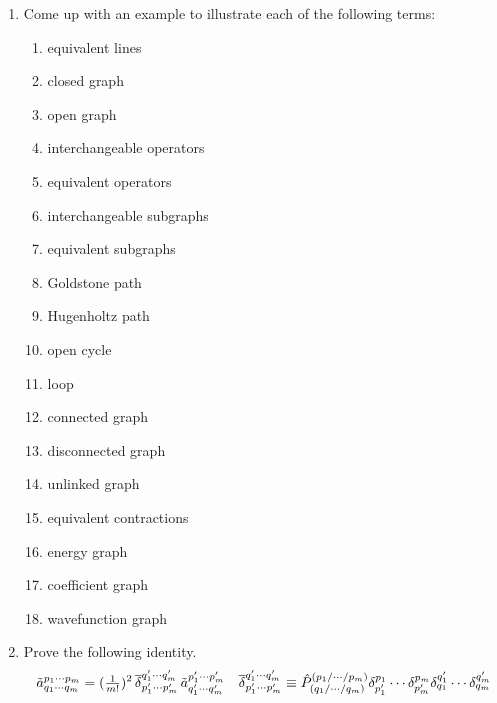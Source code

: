 \documentclass[11pt]{article}
\numberwithin{equation}{section}
\begin{document}
\begin{enumerate}
\item
  Come up with an example to illustrate each of the following terms:
  \begin{multicols}{3}
  \begin{enumerate}
  \item
    equivalent lines
  \item
    closed graph
  \item
    open graph
  \item
    interchangeable operators
  \item
    equivalent operators
  \item
    interchangeable subgraphs
  \item
    equivalent subgraphs
  \item
    Goldstone path
  \item
    Hugenholtz path
  \item
    open cycle
  \item
    loop
  \item
    connected graph
  \item
    disconnected graph
  \item
    unlinked graph
  \item
    equivalent contractions
  \item
    energy graph
  \item
    coefficient graph
  \item
    wavefunction graph
  \end{enumerate}
  \end{multicols}
\item
  Prove the following identity.
\begin{align*}
  \tilde{a}^{p_1\cdots p_m}_{q_1\cdots q_m}
=
  (\tfrac{1}{m!})^2\,
  \overline{\delta }_{p_1'\cdots p_m'}^{q_1'\cdots q_m'}\,
  \tilde{a}^{p_1'\cdots p_m'}_{q_1'\cdots q_m'}
&&
  \overline{\delta }^{q_1'\cdots q_m'}_{p_1'\cdots p_m'}
\equiv
  \hat{P}^{(p_1/\cdots /p_m)}
        _{(q_1/\cdots /q_m)}
  \delta ^{p_1}_{p_1'}\cdots \delta ^{p_m}_{p_m'}
  \delta ^{q_1'}_{q_1}\cdots \delta ^{q_m'}_{q_m}
\end{align*}
\end{enumerate}
\end{document}
